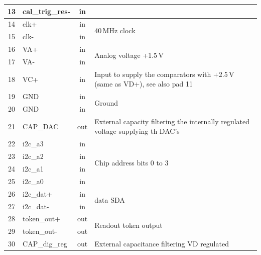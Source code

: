 \begin{table}[h]
\begin{center}
{\begin{tabular}{clcl}
	13 & cal\_trig\_res- & in  & \\
	\midrule %
	14 & clk+            & in  & \multirow{2}{*}{40\,MHz clock} \\
	15 & clk-            & in  & \\
	\midrule %
	16 & VA+             & in  &\multirow{2}{*}{Analog voltage +1.5\,V} \\
	17 & VA-             & in  & \\
	\midrule %
	18 & VC+             & in  & Input to supply the comparators with +2.5\,V (same as VD+), see also pad 11 \\
	\midrule %
	19 & GND             & in  & \multirow{2}{*}{Ground} \\
	20 & GND             & in  & \\
	\midrule %
	21 & CAP\_DAC        & out & External capacity filtering the internally regulated voltage supplying th DAC's \\
	\midrule %
	22 & i2c\_a3         & in  & \multirow{4}{*}{Chip address bits 0 to 3} \\
	23 & i2c\_a2         & in  & \\
	24 & i2c\_a1         & in  & \\
	25 & i2c\_a0         & in  & \\
	\midrule %
	26 & i2c\_dat+       & in  & \multirow{2}{*}{\isqc{} data SDA} \\
	27 & i2c\_dat-       & in  & \\
	\midrule %
	28 & token\_out+     & out & \multirow{2}{*}{Readout token output} \\
	29 & token\_out-     & out & \\
	\midrule %
	30 & CAP\_dig\_reg   & out & External capacitance filtering VD regulated \\

\end{tabular}}
\end{center}
\end{table}
